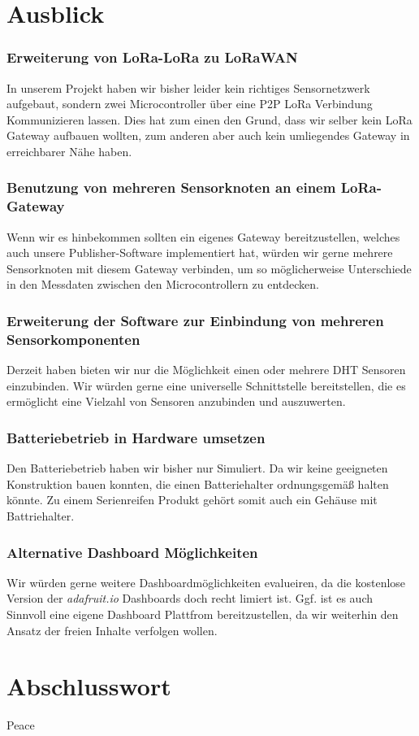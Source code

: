 \section{Ausblick} \label{Ausblick}

\subsubsection{Erweiterung von LoRa-LoRa zu LoRaWAN}
In unserem Projekt haben wir bisher leider kein richtiges Sensornetzwerk aufgebaut, sondern zwei Microcontroller über eine P2P LoRa Verbindung Kommunizieren lassen. Dies hat zum einen den Grund, dass wir selber kein LoRa Gateway aufbauen wollten, zum anderen aber auch kein umliegendes Gateway in erreichbarer Nähe haben.

\subsubsection{Benutzung von mehreren Sensorknoten an einem LoRa-Gateway}
Wenn wir es hinbekommen sollten ein eigenes Gateway bereitzustellen, welches auch unsere Publisher-Software implementiert hat, würden wir gerne mehrere Sensorknoten mit diesem Gateway verbinden, um so möglicherweise Unterschiede in den Messdaten zwischen den Microcontrollern zu entdecken.

\subsubsection{Erweiterung der Software zur Einbindung von mehreren Sensorkomponenten}
Derzeit haben bieten wir nur die Möglichkeit einen oder mehrere DHT Sensoren einzubinden. Wir würden gerne eine universelle Schnittstelle bereitstellen, die es ermöglicht eine Vielzahl von Sensoren anzubinden und auszuwerten.

\subsubsection{Batteriebetrieb in Hardware umsetzen}
Den Batteriebetrieb haben wir bisher nur Simuliert. Da wir keine geeigneten Konstruktion bauen konnten, die einen Batteriehalter ordnungsgemäß halten könnte. Zu einem Serienreifen Produkt gehört somit auch ein Gehäuse mit Battriehalter.

\subsubsection{Alternative Dashboard Möglichkeiten}
Wir würden gerne weitere Dashboardmöglichkeiten evalueiren, da die kostenlose Version der \textit{adafruit.io} Dashboards doch recht limiert ist. Ggf. ist es auch Sinnvoll eine eigene Dashboard Plattfrom bereitzustellen, da wir weiterhin den Ansatz der freien Inhalte verfolgen wollen.

\section{Abschlusswort} \label{Abschlusswort}

Peace

